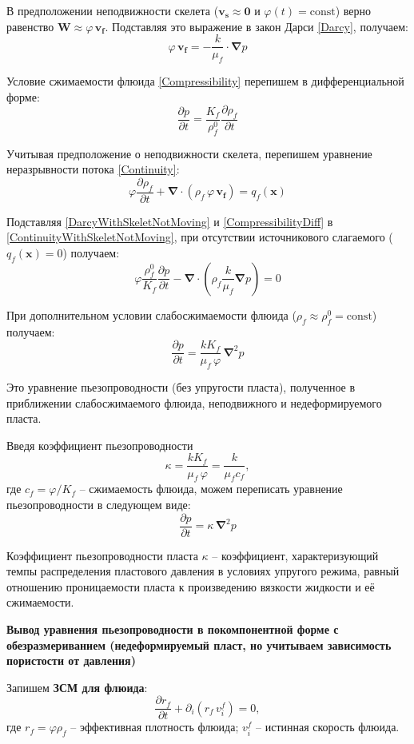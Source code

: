 \documentclass[a4paper,14pt]{extarticle}
\newcommand{\beq}{\begin{equation}}
\newcommand{\eeq}{\end{equation}}
\begin{document}
В предположении неподвижности скелета ($\pmb{v_{\!s}}\approx \pmb{0}$ и $\varphi(t)=\textrm{const}$) верно равенство $\pmb{W}\approx\varphi\, \pmb{v_{\!f}}$.
Подставляя это выражение в закон Дарси \eqref{Darcy}, получаем:
\beq\label{DarcyWithSkeletNotMoving}
\varphi\,\pmb{v_{\!f}}=-\frac{k}{\mu_{\!f}}\cdot\pmb{\nabla} p
\eeq

Условие сжимаемости флюида \eqref{Compressibility} перепишем в дифференциальной форме:
\beq\label{CompressibilityDiff}
\frac{\partial p}{\partial t}=\frac{K_{\!f}}{\rho_{\!f}^0}\frac{\partial\rho_{\!f}}{\partial t}
\eeq

Учитывая предположение о неподвижности скелета, перепишем уравнение неразрывности потока \eqref{Continuity}:
\beq\label{ContinuityWithSkeletNotMoving}
\varphi\frac{\partial\rho_{\!f}}{\partial t}+\pmb{\nabla}\cdot\left(\rho_{\!f}\,\varphi \, \pmb{v_f}\right)=q_f(\pmb{x})
\eeq

Подставляя \eqref{DarcyWithSkeletNotMoving} и \eqref{CompressibilityDiff} в \eqref{ContinuityWithSkeletNotMoving}, при отсутствии источникового слагаемого ($q_f(\pmb{x})=0$) получаем:
\beq
\varphi\frac{\rho_{\!f}^0}{K_{\!f}}\frac{\partial p}{\partial t}-\pmb{\nabla}\cdot\left(\rho_{\!f}\frac{k}{\mu_{\!f}}\pmb{\nabla} p\right)=0
\eeq

При дополнительном условии слабосжимаемости флюида ($\rho_f\approx\rho_f^0=\textrm{const}$) получаем:
\beq
\frac{\partial p}{\partial t}=\frac{kK_{\!f}}{\mu_{\!f}\,\varphi}\,\pmb{\nabla}^2p
\eeq

Это уравнение пьезопроводности (без упругости пласта), полученное в приближении слабосжимаемого флюида, неподвижного и недеформируемого пласта.

Введя коэффициент пьезопроводности
\beq
\kappa=\dfrac{kK_f}{\mu_{\!f}\,\varphi}=\dfrac{k}{\mu_{\!f}c_{\!f}},
\eeq
где $c_{\!f}=\varphi/K_{\!f}$ -- сжимаемость флюида, можем переписать уравнение пьезопроводности в следующем виде:
\beq
\frac{\partial p}{\partial t}=\kappa\,\pmb{\nabla}^2p
\eeq

Коэффициент пьезопроводности пласта $\kappa$ -- коэффициент, характеризующий темпы распределения пластового давления в условиях упругого режима, равный отношению проницаемости пласта к произведению вязкости жидкости и её сжимаемости.
\newpage

\textbf{Вывод уравнения пьезопроводности в покомпонентной форме с обезразмериванием (недеформируемый пласт, но учитываем зависимость пористости от давления)}

Запишем \textbf{ЗСМ для флюида}:
\beq
\frac{\partial r_{\!f}}{\partial t}+\partial_i\!\left(r_{\!f}\, v_i^f\right)=0,
\eeq
где $r_{\!f}=\varphi\rho_{\!f}$ -- эффективная плотность флюида; $v_i^f$ -- истинная скорость флюида.
\end{document}

